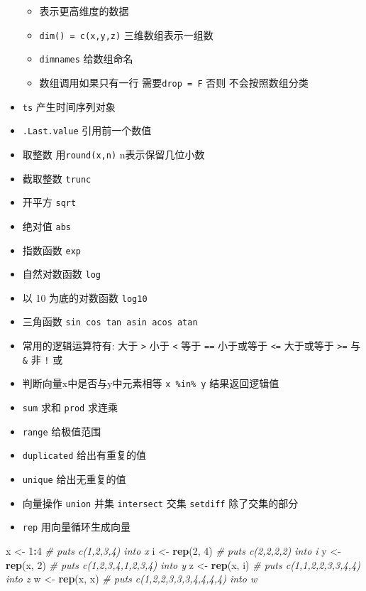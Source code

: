 \documentclass[
]{book}
\newenvironment{Shaded}{\begin{snugshade}}{\end{snugshade}}
\newcommand{\CommentTok}[1]{\textcolor[rgb]{0.56,0.35,0.01}{\textit{#1}}}
\newcommand{\DecValTok}[1]{\textcolor[rgb]{0.00,0.00,0.81}{#1}}
\newcommand{\KeywordTok}[1]{\textcolor[rgb]{0.13,0.29,0.53}{\textbf{#1}}}
\newcommand{\NormalTok}[1]{#1}
\newcommand{\OperatorTok}[1]{\textcolor[rgb]{0.81,0.36,0.00}{\textbf{#1}}}
\newcommand{\StringTok}[1]{\textcolor[rgb]{0.31,0.60,0.02}{#1}}
\providecommand{\tightlist}{%
  \setlength{\itemsep}{0pt}\setlength{\parskip}{0pt}}
\begin{document}
\begin{itemize}
  \begin{itemize}
  \tightlist
  \item
    表示更高维度的数据
  \item
    \texttt{dim()\ =\ c(x,y,z)} 三维数组表示一组数
  \item
    \texttt{dimnames} 给数组命名
  \item
    数组调用如果只有一行 需要\texttt{drop\ =\ F} 否则 不会按照数组分类
  \end{itemize}
\item
  \texttt{ts} 产生时间序列对象
\item
  \texttt{.Last.value} 引用前一个数值
\item
  取整数 用\texttt{round(x,n)} n表示保留几位小数
\item
  截取整数 \texttt{trunc}
\item
  开平方 \texttt{sqrt}
\item
  绝对值 \texttt{abs}
\item
  指数函数 \texttt{exp}
\item
  自然对数函数 \texttt{log}
\item
  以 10 为底的对数函数 \texttt{log10}
\item
  三角函数 \texttt{sin\ cos\ tan\ asin\ acos\ atan}
\item
  常用的逻辑运算符有: 大于 \texttt{\textgreater{}} 小于 \texttt{\textless{}} 等于 \texttt{==} 小于或等于 \texttt{\textless{}=} 大于或等于 \texttt{\textgreater{}=} 与 \texttt{\&} 非 \texttt{!} 或\texttt{\textbar{}}
\item
  判断向量x中是否与y中元素相等 \texttt{x\ \%in\%\ y} 结果返回逻辑值
\item
  \texttt{sum} 求和 \texttt{prod} 求连乘
\item
  \texttt{range} 给极值范围
\item
  \texttt{duplicated} 给出有重复的值
\item
  \texttt{unique} 给出无重复的值
\item
  向量操作 \texttt{union} 并集 \texttt{intersect} 交集 \texttt{setdiff} 除了交集的部分
\item
  \texttt{rep} 用向量循环生成向量
\end{itemize}

\begin{Shaded}
\begin{Highlighting}[]
\NormalTok{x <-}\StringTok{ }\DecValTok{1}\OperatorTok{:}\DecValTok{4} \CommentTok{# puts c(1,2,3,4) into x}
\NormalTok{i <-}\StringTok{ }\KeywordTok{rep}\NormalTok{(}\DecValTok{2}\NormalTok{, }\DecValTok{4}\NormalTok{) }\CommentTok{# puts c(2,2,2,2) into i}
\NormalTok{y <-}\StringTok{ }\KeywordTok{rep}\NormalTok{(x, }\DecValTok{2}\NormalTok{) }\CommentTok{# puts c(1,2,3,4,1,2,3,4) into y}
\NormalTok{z <-}\StringTok{ }\KeywordTok{rep}\NormalTok{(x, i) }\CommentTok{# puts c(1,1,2,2,3,3,4,4) into z}
\NormalTok{w <-}\StringTok{ }\KeywordTok{rep}\NormalTok{(x, x) }\CommentTok{# puts c(1,2,2,3,3,3,4,4,4,4) into w}
\end{Highlighting}
\end{Shaded}
\end{document}
